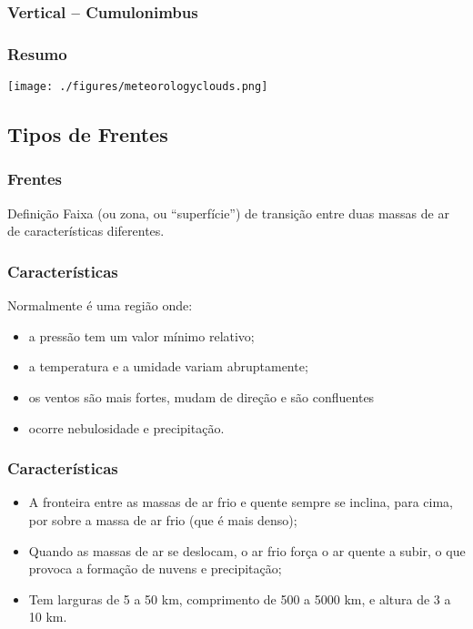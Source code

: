 \begin{frame}
\frametitle{Vertical -- Cumulonimbus}
  \begin{center}
  \end{center}
\end{frame}

\begin{frame}
\frametitle{Resumo}
  \begin{center}
    \texttt{[image: ./figures/meteorologyclouds.png]}
  \end{center}
\end{frame}

\subsection{Tipos de Frentes}
\begin{frame}
\frametitle{Frentes}
\begin{block}{Definição}
  Faixa (ou zona, ou ``superfície'') de transição entre duas massas de ar de
  características diferentes.
\end{block}
\end{frame}


\begin{frame}
\frametitle{Características}
Normalmente é uma região onde:
  \begin{itemize}[<+-| alert@+>]
  \item a pressão tem um valor mínimo relativo;
  \item a temperatura e a umidade variam abruptamente;
  \item os ventos são mais fortes, mudam de direção e são confluentes
  \item ocorre nebulosidade e precipitação.
 \end{itemize}
\end{frame}


\begin{frame}
\frametitle{Características}
  \begin{itemize}[<+-| alert@+>]
  \item A fronteira entre as massas de ar frio e quente sempre se inclina,
        para cima, por sobre a massa de ar frio (que é mais denso);
  \item Quando as massas de ar se deslocam, o ar frio força o ar quente a
        subir, o que provoca a formação de nuvens e precipitação;
  \item Tem larguras de 5 a 50 km, comprimento de 500 a 5000 km, e altura de
        3 a 10 km.
  \end{itemize}
\end{frame}


